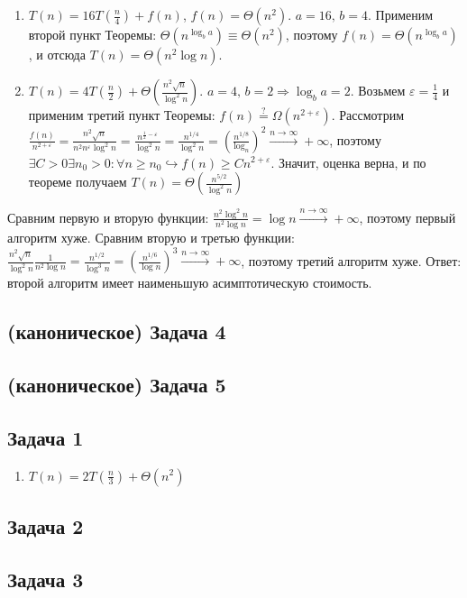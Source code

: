\documentclass[a4paper]{article}
\def\eps{\varepsilon}
\begin{document}
\begin{enumerate}
\begin{enumerate}
\end{enumerate}
\item $T(n)=16T(\frac{n}{4})+f(n)$, $f(n)=\Theta(n^2)$. $a=16,\,b=4$. Применим второй пункт Теоремы: $\Theta(n^{\log_b a})\equiv\Theta(n^2)$, поэтому $f(n)=\Theta(n^{\log_b a})$, и отсюда $T(n)=\boxed{\Theta(n^2\log n)}$.
\item $T(n)=4T(\frac{n}{2})+\Theta(\frac{n^2\sqrt{n}}{\log^2n})$. $a=4,\,b=2\Rightarrow\log_b a=2$. Возьмем $\eps=\frac{1}{4}$ и применим третий пункт Теоремы: $f(n)\overset{?}{=}\Omega(n^{2+\eps})$. Рассмотрим $\frac{f(n)}{n^{2+\eps}}=\frac{n^2\sqrt{n}}{n^2n^\eps\log^2 n}=\frac{n^{\frac{1}{2}-\eps}}{\log^2 n}=\frac{n^{1/4}}{\log^2 n}=(\frac{n^{1/8}}{\log_n})^2\overset{n\to\infty}{\longrightarrow}+\infty$, поэтому $\exists C>0\exists n_0>0\colon \forall n\geqslant n_0\hookrightarrow f(n)\geqslant C n^{2+\eps}$. Значит, оценка верна, и по теореме получаем $T(n)=\boxed{\Theta(\frac{n^{5/2}}{\log^2n})}$
\end{enumerate}
Сравним первую и вторую функции: $\frac{n^2\log^2 n}{n^2\log n}=\log n\overset{n\to\infty}{\longrightarrow}+\infty$, поэтому первый алгоритм хуже. Сравним вторую и третью функции: $\frac{n^2\sqrt{n}}{\log^2n}\frac{1}{n^2\log n}=\frac{n^{1/2}}{\log^3 n}=(\frac{n^{1/6}}{\log n})^3\overset{n\to\infty}{\longrightarrow}+\infty$, поэтому третий алгоритм хуже.\newline
Ответ: $\boxed{\mbox{второй алгоритм}}$ имеет наименьшую асимптотическую стоимость.
\subsection*{(каноническое) Задача 4}
\subsection*{(каноническое) Задача 5}
\subsection*{Задача 1}
\begin{enumerate}
\item $T(n)=2T(\frac{n}{3})+\Theta(n^2)$
\end{enumerate}
\subsection*{Задача 2}
\subsection*{Задача 3}
\end{document}
